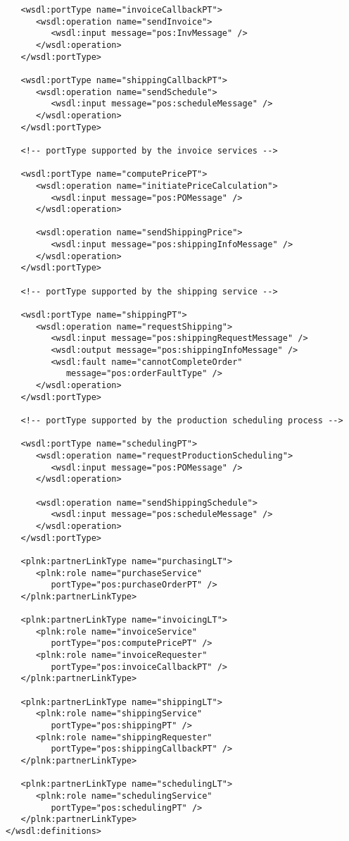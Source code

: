 \begin{verbatim}
   <wsdl:portType name="invoiceCallbackPT">
      <wsdl:operation name="sendInvoice">
         <wsdl:input message="pos:InvMessage" />
      </wsdl:operation>
   </wsdl:portType>

   <wsdl:portType name="shippingCallbackPT">
      <wsdl:operation name="sendSchedule">
         <wsdl:input message="pos:scheduleMessage" />
      </wsdl:operation>
   </wsdl:portType>

   <!-- portType supported by the invoice services -->

   <wsdl:portType name="computePricePT">
      <wsdl:operation name="initiatePriceCalculation">
         <wsdl:input message="pos:POMessage" />
      </wsdl:operation>      
      
      <wsdl:operation name="sendShippingPrice">
         <wsdl:input message="pos:shippingInfoMessage" />
      </wsdl:operation>
   </wsdl:portType>

   <!-- portType supported by the shipping service -->

   <wsdl:portType name="shippingPT">
      <wsdl:operation name="requestShipping">
         <wsdl:input message="pos:shippingRequestMessage" />
         <wsdl:output message="pos:shippingInfoMessage" />
         <wsdl:fault name="cannotCompleteOrder"
            message="pos:orderFaultType" />
      </wsdl:operation>
   </wsdl:portType>

   <!-- portType supported by the production scheduling process -->

   <wsdl:portType name="schedulingPT">
      <wsdl:operation name="requestProductionScheduling">
         <wsdl:input message="pos:POMessage" />
      </wsdl:operation>
      
      <wsdl:operation name="sendShippingSchedule">
         <wsdl:input message="pos:scheduleMessage" />
      </wsdl:operation>
   </wsdl:portType> 

   <plnk:partnerLinkType name="purchasingLT">
      <plnk:role name="purchaseService"
         portType="pos:purchaseOrderPT" />
   </plnk:partnerLinkType> 

   <plnk:partnerLinkType name="invoicingLT">
      <plnk:role name="invoiceService"
         portType="pos:computePricePT" />
      <plnk:role name="invoiceRequester"
         portType="pos:invoiceCallbackPT" />
   </plnk:partnerLinkType> 

   <plnk:partnerLinkType name="shippingLT">
      <plnk:role name="shippingService"
         portType="pos:shippingPT" />
      <plnk:role name="shippingRequester"
         portType="pos:shippingCallbackPT" />
   </plnk:partnerLinkType> 

   <plnk:partnerLinkType name="schedulingLT">
      <plnk:role name="schedulingService"
         portType="pos:schedulingPT" />
   </plnk:partnerLinkType>
</wsdl:definitions>
\end{verbatim}

